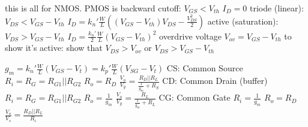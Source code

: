 \documentclass[12pt]{article}
\begin{document}
\begin{spacing}{0.8}
\begin{multicols*}{2}
\begin{flushleft}
\begin{outline}[longenum]
  \1 this is all for NMOS. PMOS is backward
  \1 cutoff: $V_{GS} < V_{th}$
    \2 $I_D=0$
  \1 triode (linear): $V_{DS} < V_{GS}-V_{th}$
    \2 $I_D = k_n' \frac{W}{L}
    \left( (V_{GS}-V_{th})V_{DS} - \frac{V_{DS}^2}{2} \right)$
  \1 active (saturation): $V_{DS} > V_{GS}-V_{th}$
    \2 $I_D = \frac{k_n'}{2}\frac{W}{L}(V_{GS}-V_{th})^2$
    \2 overdrive voltage $V_{ov}=V_{GS}-V_{th}$
  \1 to show it's active: show that $V_{DS} > V_{ov}$ or $V_{DS} > V_{GS} - V_{th}$

  \1 $g_m=k_n' \frac{W}{L}(V_{GS}-V_t) = k_p' \frac{W}{L}(V_{SG}-V_t)$
  \1 CS: Common Source
    \2 $R_i=R_G=R_{G1}||R_{G2}$
    \2 $R_o=R_D$
    \2 $\frac{V_o}{V_g}=\frac{R_D||R_L}{\frac{1}{g_m}+R_S}$
  \1 CD: Common Drain (buffer)
    \2 $R_i=R_G=R_{G1}||R_{G2}$
    \2 $R_o=\frac{1}{g_m}$
    \2 $\frac{V_o}{V_g}=\frac{R_L}{\frac{1}{g_m}+R_L}$
  \1 CG: Common Gate
    \2 $R_i=\frac{1}{g_m}$
    \2 $R_o=R_D$
    \2 $\frac{V_o}{V_s}=\frac{R_D||R_L}{R_i}$




\end{outline}
\end{flushleft}
\end{multicols*}
\end{spacing}
\end{document}
